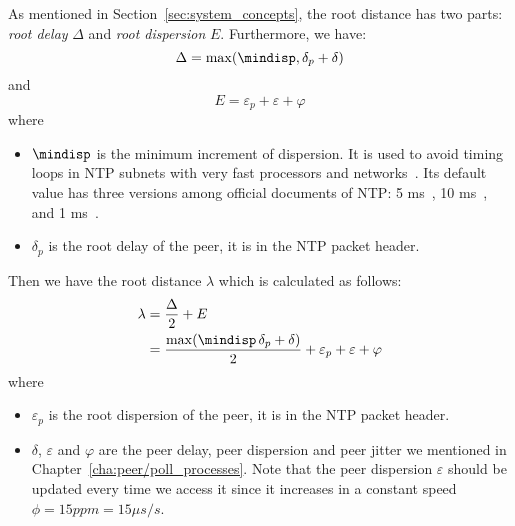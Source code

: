 As mentioned in Section~\ref{sec:system_concepts}, the root distance has two
parts: \emph{root delay} $\Delta$ and \emph{root dispersion} $E$. Furthermore, 
we have: 
\begin{equation}
    \Delta = \max(\mindisp, \delta_p + \delta)
    \label{eq:root_delay}
\end{equation}
and
\begin{equation}
    E = \varepsilon_p + \varepsilon + \varphi
    \label{eq:root_dispersion}
\end{equation}
where 
\begin{itemize}
    \item $\mindisp$ is the minimum increment of dispersion. It is used to
        avoid timing loops in NTP subnets with very fast processors and
        networks~\cite{rfc5905}. Its default value has three versions among
        official documents of NTP: 5 ms~\cite{rfc5905}, 10 ms~\cite{rfc5905},
        and 1 ms~\cite{performance_metrics}.
    \item $\delta_p$ is the root delay of the peer, it is in the NTP packet
        header.
\end{itemize}
Then we have the root distance $\lambda$ which is calculated as follows:
\begin{align}
    \lambda & = \frac{\Delta}{2} + E\\
    & =\frac{\max(\mindisp\, \delta_p + \delta)}{2} 
    + \varepsilon_p + \varepsilon + \varphi
    \label{eq:root_distance}
\end{align}
where 
\begin{itemize}
    \item $\varepsilon_p$ is the root dispersion of the peer, it is in the NTP
        packet header.
    \item $\delta$, $\varepsilon$ and $\varphi$ are the peer delay, peer
        dispersion and peer jitter we mentioned in
        Chapter~\ref{cha:peer/poll_processes}. Note that the peer dispersion
        $\varepsilon$ should be updated every time we access it since it
        increases in a constant speed $\phi = 15 ppm = 15 \mu s/s$.
\end{itemize}

